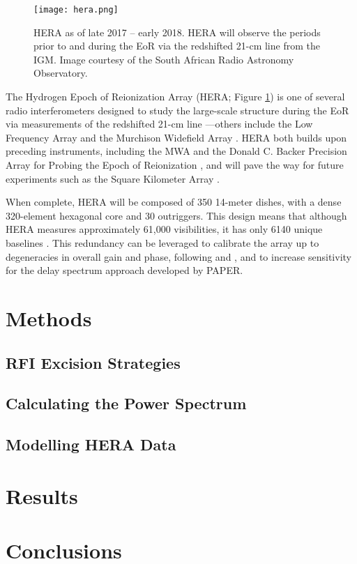 \documentclass[12pt]{article}
\begin{document}
\begin{figure}[tb]
	\centering
	\texttt{[image: hera.png]}
	\caption[HERA as of late 2017 -- early 2018]{HERA as of late 2017 -- early 2018. HERA will observe the periods prior to and during the EoR via the redshifted 21-cm line from the IGM. Image courtesy of the South African Radio Astronomy Observatory.}
	\label{fig:hera}
\end{figure}

The Hydrogen Epoch of Reionization Array (HERA; Figure \ref{fig:hera}) is one of several radio interferometers designed to study the large-scale structure during the EoR via measurements of the redshifted 21-cm line \citep{deboer2017}---others include the Low Frequency Array \citep[LOFAR;][]{vanHaarlem2013} and the Murchison Widefield Array \citep[MWA;][]{tingay2013}. HERA both builds upon preceding instruments, including the MWA and the Donald C. Backer Precision Array for Probing the Epoch of Reionization \citep[PAPER;][]{parsons2010}, and will pave the way for future experiments such as the Square Kilometer Array \citep[SKA; e.g.,][]{mellema2013}.

When complete, HERA will be composed of 350 14-meter dishes, with a dense 320-element hexagonal core and 30 outriggers. This design means that although HERA measures approximately 61,000 visibilities, it has only 6140 unique baselines . This redundancy can be leveraged to calibrate the array up to degeneracies in overall gain and phase, following \cite{liu2010} and \cite{zheng2014}, and to increase sensitivity for the delay spectrum approach developed by PAPER. 

\section{Methods} \label{sec:methods}

\subsection{RFI Excision Strategies} \label{subsec:rfi_excision}



\subsection{Calculating the Power Spectrum} \label{subsec:calc_ps}

\subsection{Modelling HERA Data} \label{subsec:modelling}


\section{Results}

\section{Conclusions}



\end{document}
